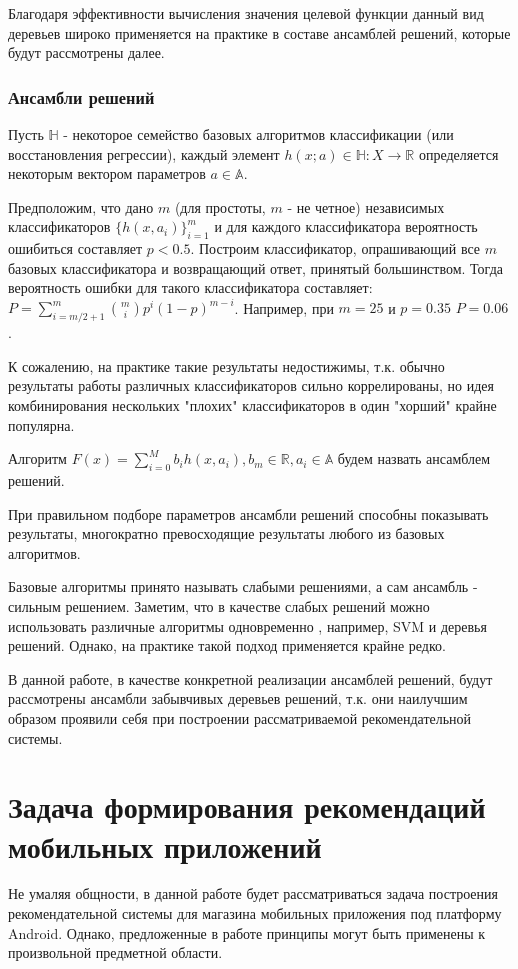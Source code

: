 \documentclass[12pt,a4paper]{report}
\begin{document}
Благодаря эффективности вычисления значения целевой функции данный вид деревьев широко применяется на практике в составе ансамблей решений, которые будут рассмотрены далее.
\subsection{Ансамбли решений}
Пусть $\mathbb{H}$ - некоторое семейство базовых алгоритмов классификации (или восстановления регрессии), каждый элемент $h(x; a) \in \mathbb{H} : X \to \mathbb{R}$ определяется некоторым вектором параметров $a \in \mathbb{A}$.

Предположим, что дано $m$ (для простоты, $m$ - не четное) независимых классификаторов $\{h(x, a_i)\}_{i=1}^m$ и для каждого классификатора вероятность ошибиться составляет $p < 0.5$.	Построим классификатор, опрашивающий все $m$ базовых классификатора и возвращающий ответ, принятый большинством. Тогда вероятность ошибки для такого классификатора составляет: $P = \sum_{i = m/2 + 1}^m \binom{m}{i}p^{i}(1-p)^{m-i}$. Например, при $m=25$ и $p=0.35$ $P=0.06$.

К сожалению, на практике такие результаты недостижимы, т.к. обычно результаты работы различных классификаторов сильно коррелированы, но идея комбинирования нескольких "плохих" классификаторов в один "хорший" крайне популярна.

\begin{Def}
Алгоритм $F(x) = \sum_{i=0}^{M}b_ih(x,a_i), b_m \in \mathbb{R}, a_i \in \mathbb{A}$ будем назвать ансамблем решений.
\end{Def}
При правильном подборе параметров ансамбли решений способны показывать результаты, многократно превосходящие результаты любого из базовых алгоритмов.


Базовые алгоритмы принято называть $\textit{слабыми решениями}$, а сам ансамбль - $\textit{сильным решением}$.
Заметим, что в качестве слабых решений можно использовать различные алгоритмы одновременно , например, SVM и деревья решений. Однако, на практике такой подход применяется крайне редко.

В данной работе, в качестве конкретной реализации ансамблей решений, будут рассмотрены ансамбли забывчивых деревьев решений, т.к. они наилучшим образом проявили себя при построении рассматриваемой рекомендательной системы.

\chapter{Задача формирования рекомендаций мобильных приложений}
Не умаляя общности, в данной работе будет рассматриваться задача построения рекомендательной системы для магазина мобильных приложения под платформу Android. Однако, предложенные в работе принципы могут быть применены к произвольной предметной области.
\end{document}
